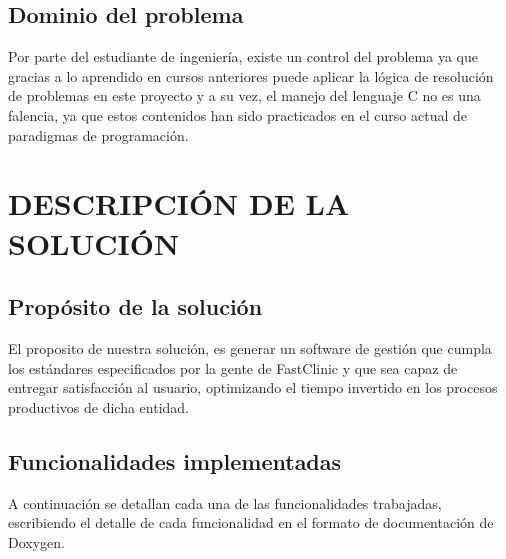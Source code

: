 \documentclass[12pt,letterpaper]{article}
\begin{document}
	\subsection{Dominio del problema}
	Por parte del estudiante de ingeniería, existe un control del problema ya que gracias a lo aprendido en cursos anteriores puede aplicar la lógica de resolución de problemas en este proyecto y a su vez, el manejo del lenguaje C no es una falencia, ya que estos contenidos han sido practicados en el curso actual de paradigmas de programación. 

\section{DESCRIPCIÓN DE LA SOLUCIÓN}
	\subsection{Propósito de la solución}
	El proposito de nuestra solución, es generar un software de gestión que cumpla los estándares especificados por la gente de FastClinic y que sea capaz de entregar satisfacción al usuario, optimizando el tiempo invertido en los procesos productivos de dicha entidad.
	
	
	\subsection{Funcionalidades implementadas}
	A continuación se detallan cada una de las funcionalidades trabajadas, escribiendo el detalle de cada funcionalidad en el formato de documentación de Doxygen.
	
\end{document}
